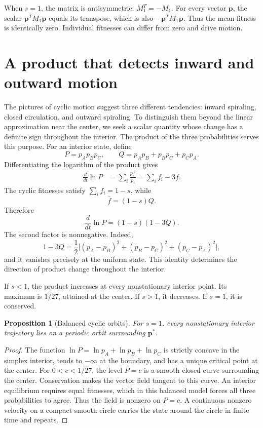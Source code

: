 \documentclass[11pt,oneside,openany]{book}
\newtheorem{proposition}[theorem]{Proposition}
\theoremstyle{definition}
\theoremstyle{remark}
\newcommand{\p}{\mathbf{p}}
\numberwithin{equation}{chapter}
\begin{document}
When $s=1$, the matrix is antisymmetric: $M_1^T=-M_1$. For every vector $\p$, the scalar $\p^TM_1\p$ equals its transpose, which is also $-\p^TM_1\p$. Thus the mean fitness is identically zero. Individual fitnesses can differ from zero and drive motion.

\section{A product that detects inward and outward motion}
The pictures of cyclic motion suggest three different tendencies: inward spiraling, closed circulation, and outward spiraling. To distinguish them beyond the linear approximation near the center, we seek a scalar quantity whose change has a definite sign throughout the interior. The product of the three probabilities serves this purpose.
For an interior state, define
\[
P=p_Ap_Bp_C,\qquad Q=p_Ap_B+p_Bp_C+p_Cp_A.
\]
Differentiating the logarithm of the product gives
\begin{align*}
\frac{d}{dt}\ln P
&=\sum_i\frac{p_i'}{p_i}
=\sum_i f_i-3\bar f.
\end{align*}
The cyclic fitnesses satisfy $\sum_i f_i=1-s$, while
\[
\bar f=(1-s)Q.
\]
Therefore
\begin{equation}\label{eq:productderivative}
\boxed{\frac{d}{dt}\ln P=(1-s)(1-3Q).}
\end{equation}
The second factor is nonnegative. Indeed,
\[
1-3Q=\frac12\bigl[(p_A-p_B)^2+(p_B-p_C)^2+(p_C-p_A)^2\bigr],
\]
and it vanishes precisely at the uniform state. This identity determines the direction of product change throughout the interior.

If $s<1$, the product increases at every nonstationary interior point. Its maximum is $1/27$, attained at the center. If $s>1$, it decreases. If $s=1$, it is conserved.

\begin{proposition}[Balanced cyclic orbits]
For $s=1$, every nonstationary interior trajectory lies on a periodic orbit surrounding $\p^*$.
\end{proposition}
\begin{proof}
The function $\ln P=\ln p_A+\ln p_B+\ln p_C$ is strictly concave in the simplex interior, tends to $-\infty$ at the boundary, and has a unique critical point at the center. For $0<c<1/27$, the level $P=c$ is a smooth closed curve surrounding the center. Conservation makes the vector field tangent to this curve. An interior equilibrium requires equal fitnesses, which in this balanced model forces all three probabilities to agree. Thus the field is nonzero on $P=c$. A continuous nonzero velocity on a compact smooth circle carries the state around the circle in finite time and repeats.
\end{proof}
\end{document}
